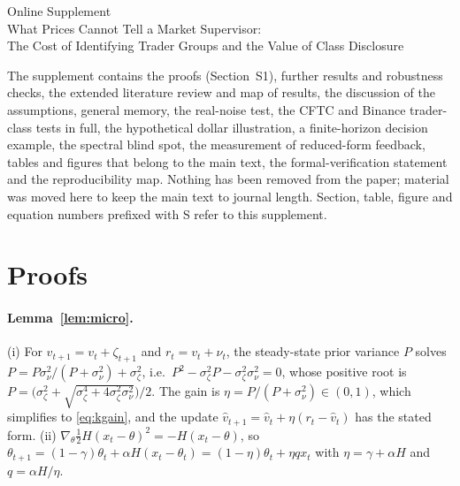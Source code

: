 \documentclass[12pt]{article}
\theoremstyle{definition}
\theoremstyle{remark}
\begin{document}
\appendix
\clearpage
\singlespacing\small
\renewcommand{\topfraction}{0.9}\renewcommand{\bottomfraction}{0.8}\renewcommand{\textfraction}{0.07}\renewcommand{\floatpagefraction}{0.75}\setcounter{topnumber}{4}\setcounter{bottomnumber}{3}\setcounter{totalnumber}{6}
\setcounter{page}{1}\setcounter{table}{0}\setcounter{figure}{0}\setcounter{equation}{0}
\begin{center}{\Large Online Supplement}\\[4pt]{\large What Prices Cannot Tell a Market Supervisor:\\ The Cost of Identifying Trader Groups and the Value of Class Disclosure}\end{center}
\noindent The supplement contains the proofs (Section~S1), further results and robustness checks, the extended literature review and map of results, the discussion of the assumptions, general memory, the real-noise test, the CFTC and Binance trader-class tests in full, the hypothetical dollar illustration, a finite-horizon decision example, the spectral blind spot, the measurement of reduced-form feedback, tables and figures that belong to the main text, the formal-verification statement and the reproducibility map. Nothing has been removed from the paper; material was moved here to keep the main text to journal length. Section, table, figure and equation numbers prefixed with S refer to this supplement.

\section{Proofs}\label{app:proofs}

\paragraph{Lemma~\ref{lem:micro}.} (i) For $v_{t+1}=v_t+\zeta_{t+1}$ and $r_t=v_t+\nu_t$, the steady-state prior variance $P$ solves $P=P\sigma_\nu^2/(P+\sigma_\nu^2)+\sigma_\zeta^2$, i.e.\ $P^2-\sigma_\zeta^2P-\sigma_\zeta^2\sigma_\nu^2=0$, whose positive root is $P=\bigl(\sigma_\zeta^2+\sqrt{\sigma_\zeta^4+4\sigma_\zeta^2\sigma_\nu^2}\bigr)/2$. The gain is $\eta=P/(P+\sigma_\nu^2)\in(0,1)$, which simplifies to \eqref{eq:kgain}, and the update $\hat v_{t+1}=\hat v_t+\eta(r_t-\hat v_t)$ has the stated form. (ii) $\nabla_\theta\tfrac12H(x_t-\theta)^2=-H(x_t-\theta)$, so $\theta_{t+1}=(1-\gamma)\theta_t+\alpha H(x_t-\theta_t)=(1-\eta)\theta_t+\eta qx_t$ with $\eta=\gamma+\alpha H$ and $q=\alpha H/\eta$.
\end{document}
